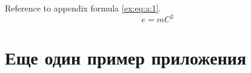\documentclass[
    xelatex,
    chapter-numbering,
]{G7-32-2017}
\begin{document}
\lipsum[3-5]

Reference to appendix formula \eqref{ex:eq:a:1}.
\begin{equation}
    \label{ex:eq:a:1}
    e = mC^2
\end{equation}

\chapter{Еще один пример приложения}

\lipsum[1-2]




% 

% 





% 


% 


% 
% 
\end{document}
